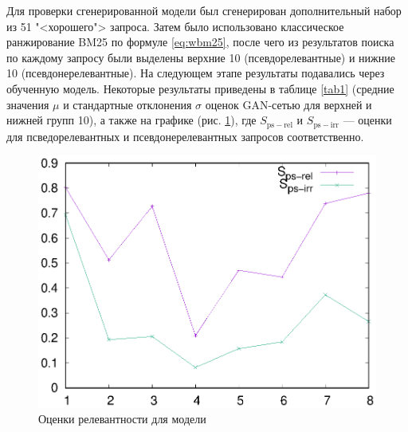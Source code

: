 Для проверки сгенерированной модели был сгенерирован дополнительный набор из 51 "<хорошего"> запроса. Затем 
было использовано классическое ранжирование BM25 по формуле \eqref{eq:wbm25}, после чего из результатов поиска 
по каждому запросу были выделены верхние 10 (псевдорелевантные) и нижние 10 (псевдонерелевантные).
На следующем этапе результаты подавались через обученную модель. Некоторые результаты приведены в таблице \ref{tab1}
(средние значения $\mu$ и стандартные отклонения $\sigma$ оценок GAN-сетью для верхней и нижней групп 10), а также
на графике (рис. \ref{fig:gram-scores}), где $S_{\mathrm{ps-rel}}$ и $S_{\mathrm{ps-irr}}$ --- оценки для
псведорелевантных и псевдонерелевантных запросов соответственно.

\begin{figure}
    \centerline{\includegraphics[scale=0.8]{311_scores.eps}}
    \caption{Оценки релевантности для модели}\label{fig:gram-scores}
\end{figure}

